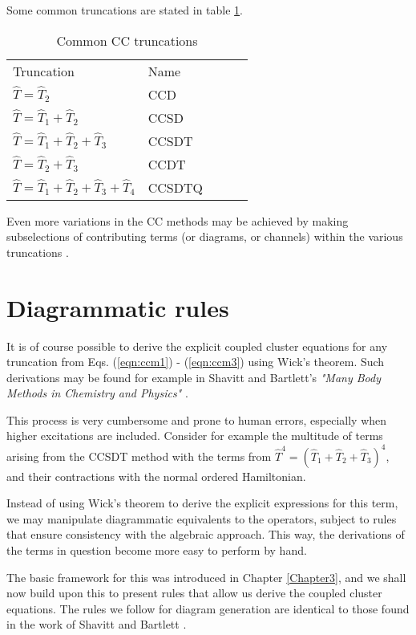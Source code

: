Some common truncations are stated in table \ref{tab:cctrunc}.
\begin{table}[]
\centering
\caption{Common CC truncations}
\label{tab:cctrunc}
\begin{tabular}{lllll}
Truncation & Name & \\
$\hat{T} = \hat{T}_2$           & CCD   &  \\
$\hat{T} = \hat{T}_1 + \hat{T}_2$          & CCSD  &  \\
$\hat{T} = \hat{T}_1 + \hat{T}_2 +\hat{T}_3$           & CCSDT     &  \\
$\hat{T} = \hat{T}_2 + \hat{T}_3$           & CCDT     &   \\
$\hat{T} = \hat{T}_1 + \hat{T}_2 +  \hat{T}_3 + \hat{T}_4$           & CCSDTQ    &   \\
\end{tabular}
\end{table}

Even more variations in the CC methods may be achieved by making
subselections of contributing terms (or diagrams, or channels) within
the various truncations \cite{Shepherd2013}.


\section{Diagrammatic rules}

It is of course possible to derive the explicit coupled cluster
equations for any truncation from Eqs. (\ref{eqn:ccm1}) -
(\ref{eqn:ccm3}) using Wick's theorem. Such derivations may be found
for example in Shavitt and 
Bartlett's \emph{"Many Body Methods in  Chemistry and Physics"} \cite[Chapter 9]{ShavittBartlett2009}.

This process is very cumbersome and prone to human errors, especially
when higher excitations are included. Consider for example the
multitude of terms arising from the CCSDT method with the terms from
$\hat{T}^4 = (\hat{T}_1 + \hat{T}_2 + \hat{T}_3)^4$, and their
contractions with the normal ordered Hamiltonian.

Instead of using Wick's theorem to derive the explicit expressions for this term, we may manipulate diagrammatic equivalents to the operators, subject to rules that ensure consistency
with the algebraic approach. This way, the derivations of the terms in question become more easy to perform by hand.  

The basic framework for this was introduced in Chapter
\ref{Chapter3}, and we shall now build upon this to present rules
that allow us derive the coupled cluster equations. The rules we follow
for diagram generation are identical to those found in the work of
Shavitt and Bartlett \cite[p.297]{ShavittBartlett2009}.

